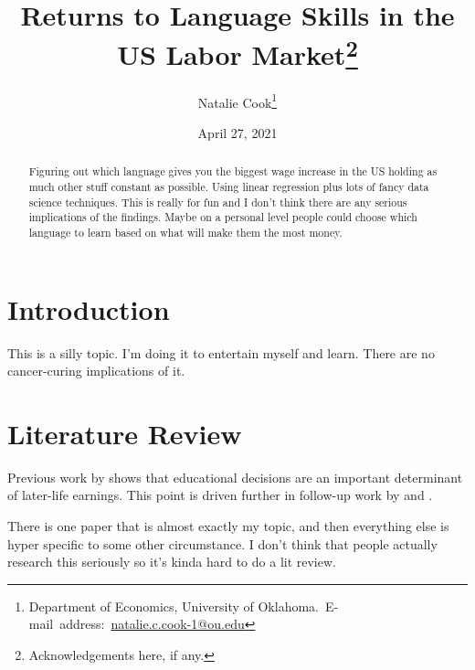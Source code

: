 \documentclass[12pt,english]{article}
\begin{document}
\begin{singlespace}
\title{Returns to Language Skills in the US Labor Market\thanks{Acknowledgements here, if any.}}
\end{singlespace}

\author{Natalie Cook\thanks{Department of Economics, University of Oklahoma.\
E-mail~address:~\href{mailto:student.name@ou.edu}{natalie.c.cook-1@ou.edu}}}

\date{April 27, 2021}

\maketitle

\begin{abstract}
\begin{singlespace}
Figuring out which language gives you the biggest wage increase in the US holding as much other stuff constant as possible. Using linear regression plus lots of fancy data science techniques. This is really for fun and I don't think there are any serious implications of the findings. Maybe on a personal level people could choose which language to learn based on what will make them the most money. 
\end{singlespace}

\end{abstract}
\vfill{}


\pagebreak{}


\section{Introduction}\label{sec:intro}
This is a silly topic. I'm doing it to entertain myself and learn. There are no cancer-curing implications of it. 

\section{Literature Review}\label{sec:litreview}
Previous work by \citet{rhur} shows that educational decisions are an important determinant of later-life earnings. This point is driven further in follow-up work by \citet{altonji_al2012} and \citet{altonji_al2016}.

There is one paper that is almost exactly my topic, and then everything else is hyper specific to some other circumstance. I don't think that people actually research this seriously so it's kinda hard to do a lit review. 
\end{document}
